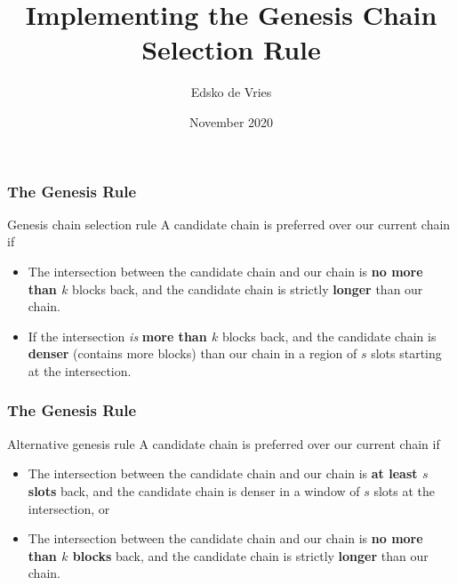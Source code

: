 \documentclass[usenames,dvipsnames,t]{beamer}
\title{Implementing the Genesis Chain Selection Rule}
\author{Edsko de Vries}
\institute{Well-Typed}
\date{November 2020}
\begin{document}
\frame{\titlepage}


\begin{frame}
\frametitle{The Genesis Rule}

\begin{alertblock}{Genesis chain selection rule}
A candidate chain is preferred over our current chain if

\begin{itemize}
\item The intersection between the candidate chain and our chain is \textbf{no
more than $k$} blocks back, and the candidate chain is strictly \textbf{longer}
than our chain.

\item If the intersection \emph{is} \textbf{more than $k$} blocks back, and the
candidate chain is \textbf{denser} (contains more blocks) than our chain in
a region of $s$ slots starting at the intersection.
\end{itemize}
\end{alertblock}

\end{frame}


\begin{frame}
\frametitle{The Genesis Rule}

\begin{alertblock}{Alternative genesis rule}
A candidate chain is preferred over our current chain if

\begin{itemize}
\item The intersection between the candidate chain and our chain is
\textbf{at least $s$ slots} back, and the candidate chain is denser in a window
of $s$ slots at the intersection, or

\item The intersection between the candidate chain and our chain is \textbf{no
more than $k$ blocks} back, and the candidate chain is strictly \textbf{longer}
than our chain.
\end{itemize}

\end{alertblock}

\end{frame}

\end{document}
